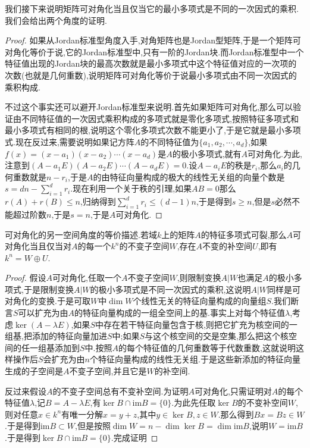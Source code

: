 我们接下来说明矩阵可对角化当且仅当它的最小多项式是不同的一次因式的乘积.我们会给出两个角度的证明.
\begin{proof}

如果从Jordan标准型角度入手,对角矩阵也是Jordan型矩阵,于是一个矩阵可对角化等价于说,它的Jordan标准型中,只有一阶的Jordan块.而Jordan标准型中一个特征值出现的Jordan块的最高次数就是最小多项式中这个特征值对应的一次项的次数(也就是几何重数),说明矩阵可对角化等价于说最小多项式由不同一次因式的乘积构成.

不过这个事实还可以避开Jordan标准型来说明.首先如果矩阵可对角化,那么可以验证由不同特征值的一次因式乘积构成的多项式就是零化多项式,按照特征多项式和最小多项式有相同的根,说明这个零化多项式次数不能更小了,于是它就是最小多项式.现在反过来,需要说明如果记方阵$A$的不同特征值为$\{a_1,a_2,\cdots,a_d\}$,如果$f(x)=(x-a_1)(x-a_2)\cdots(x-a_d)$是$A$的极小多项式,就有$A$可对角化.为此,注意到$(A-a_1E)(A-a_2E)\cdots(A-a_dE)=0$.设$A-a_iE$的秩是$r_i$,那么$a_i$的几何重数就是$n-r_i$,于是$A$的由特征向量构成的极大的线性无关组的向量个数是$s=dn-\sum_{i=1}^{d}r_i$.现在利用一个关于秩的引理,如果$AB=0$那么$r(A)+r(B)\le n$,归纳得到$\sum_{i=1}^{d}r_i\le(d-1)n$,于是得到$s\ge n$,但是$s$必然不能超过阶数$n$,于是$s=n$,于是$A$可对角化.
\end{proof}

可对角化的另一空间角度的等价描述.若域$k$上的矩阵$A$的特征多项式可裂,那么$A$可对角化当且仅当对$A$的每一个$k^n$的不变子空间$W$,存在$A$不变的补空间$U$,即有$k^n=W\oplus U$.
\begin{proof}
	
	假设$A$可对角化,任取一个$A$不变子空间$W$,则限制变换$A|W$也满足$A$的极小多项式,于是限制变换$A|W$的极小多项式是不同一次因式的乘积,这说明$A|W$同样是可对角化的变换.于是可取$W$中$\dim W$个线性无关的特征向量构成的向量组$S$.我们断言$S$可以扩充为由$A$的特征向量构成的一组全空间上的基.事实上对每个特征值$\lambda$,考虑$\ker(A-\lambda E)$,如果$S$中存在若干特征向量包含于核,则把它扩充为核空间的一组基,把添加的特征向量加进$S$中;如果$S$与这个核空间的交是空集,那么把这个核空间的任一组基添加到$S$中.按照$A$的每个特征值的几何重数等于代数重数,这就说明这样操作后$S$会扩充为由$n$个特征向量构成的线性无关组.于是这些新添加的特征向量生成的子空间是$A$不变子空间,并且它是$W$的补空间.
	
	反过来假设$A$的不变子空间总有不变补空间.为证明$A$可对角化,只需证明对$A$的每个特征值$\lambda$,记$B=A-\lambda E$,有$\ker B\cap\mathrm{im}B=\{0\}$.为此先任取$\ker B$的不变补空间$W$,则对任意$x\in k^n$有唯一分解$x=y+z$,其中$y\in\ker B,z\in W$.那么得到$Bx=Bz\in W$.于是得到$\mathrm{im}B\subset W$,但是按照$\dim W=n-\dim\ker B=\dim\mathrm{im}B$,说明$W=\mathrm{im}B$.于是得到$\ker B\cap\mathrm{im}B=\{0\}$.完成证明
\end{proof}

